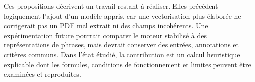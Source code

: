 Ces propositions décrivent un travail restant à réaliser. Elles précèdent logiquement l'ajout d'un modèle appris, car une vectorisation plus élaborée ne corrigerait pas un PDF mal extrait ni des champs incohérents. Une expérimentation future pourrait comparer le moteur stabilisé à des représentations de phrases, mais devrait conserver des entrées, annotations et critères communs. Dans l'état étudié, la contribution est un calcul heuristique explicable dont les formules, conditions de fonctionnement et limites peuvent être examinées et reproduites.

